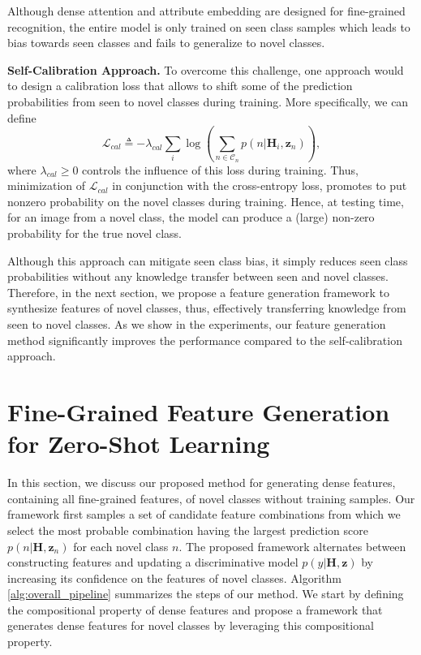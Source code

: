 \documentclass[10pt,journal,compsoc]{IEEEtran}
\newcommand{\z}{\boldsymbol{z}}
\renewcommand{\H}{\boldsymbol{H}}
\newcommand{\mL}{\mathcal{L}}
\newcommand{\C}{\mathcal{C}}
\newcommand{\1}{\boldsymbol{1}}
\newcommand{\0}{\boldsymbol{0}}
\newcommand{\<}{\langle}
\renewcommand{\>}{\rangle}
\newcommand{\myparagraph}[1]{\vspace{-2pt}\medskip\noindent\textbf{#1}}
\begin{document}
Although dense attention and attribute embedding are designed for fine-grained recognition, the entire model is only trained on seen class samples which leads to bias towards seen classes and fails to generalize to novel classes.

\myparagraph{Self-Calibration Approach.}
To overcome this challenge, one approach would to design a calibration loss that allows to shift some of the prediction probabilities from seen to novel classes during training. More specifically, we can define
\begin{equation}
\label{eq:loss_cal}
\mL_{cal} \triangleq -\lambda_{cal}\sum_{i} \log\left(\sum_{n\in \C_{n}} p(n|\H_i,\z_{n}) \right),
\end{equation}
where $\lambda_{cal} \geq 0$ controls the influence of this loss during training.
Thus, minimization of $\mL_{cal}$ in conjunction with the cross-entropy loss, promotes to put nonzero probability on the novel classes during training.
Hence, at testing time, for an image from a novel class, the model can produce a (large) non-zero probability for the true novel class.  

Although this approach can mitigate seen class bias, it simply reduces seen class probabilities without any knowledge transfer between seen and novel classes. Therefore, in the next section, we propose a feature generation framework to synthesize features of novel classes, thus, effectively transferring knowledge from seen to novel classes. As we show in the experiments, our feature generation method significantly improves the performance compared to the self-calibration approach.


\section{Fine-Grained Feature Generation for Zero-Shot Learning}
\label{sec:generate_fine_grained_features}
In this section, we discuss our proposed method for generating dense features, containing all fine-grained features, of novel classes without training samples. 
Our framework first samples a set of candidate feature combinations from which we select the most probable combination having the largest prediction score $p(n|\H,\z_{n})$ for each novel class $n$. The proposed framework alternates between constructing features and updating a discriminative model $p(y|\H,\z)$ by increasing its confidence on the features of novel classes. Algorithm \ref{alg:overall_pipeline} summarizes the steps of our method. We start by defining the compositional property of dense features and propose a framework that generates dense features for novel classes by leveraging this compositional property.
\end{document}
